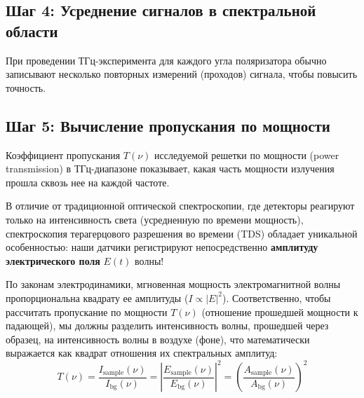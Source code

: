 \subsection{Шаг 4: Усреднение сигналов в спектральной области}

При проведении ТГц-эксперимента для каждого угла поляризатора обычно записывают несколько повторных измерений (проходов) сигнала, чтобы повысить точность.


\subsection{Шаг 5: Вычисление пропускания по мощности}

Коэффициент пропускания $T(\nu)$ исследуемой решетки по мощности (power transmission) в ТГц-диапазоне показывает, какая часть мощности излучения прошла сквозь нее на каждой частоте. 

В отличие от традиционной оптической спектроскопии, где детекторы реагируют только на интенсивность света (усредненную по времени мощность), спектроскопия терагерцового разрешения во времени (TDS) обладает уникальной особенностью: наши датчики регистрируют непосредственно \textbf{амплитуду электрического поля} $E(t)$ волны! 

По законам электродинамики, мгновенная мощность электромагнитной волны пропорциональна квадрату ее амплитуды ($I \propto |E|^2$). Соответственно, чтобы рассчитать пропускание по мощности $T(\nu)$ (отношение прошедшей мощности к падающей), мы должны разделить интенсивность волны, прошедшей через образец, на интенсивность волны в воздухе (фоне), что математически выражается как квадрат отношения их спектральных амплитуд:
\begin{equation}
T(\nu) = \frac{I_{\text{sample}}(\nu)}{I_{\text{bg}}(\nu)} = \left| \frac{E_{\text{sample}}(\nu)}{E_{\text{bg}}(\nu)} \right|^2 = \left( \frac{A_{\text{sample}}(\nu)}{A_{\text{bg}}(\nu)} \right)^2
\end{equation}

